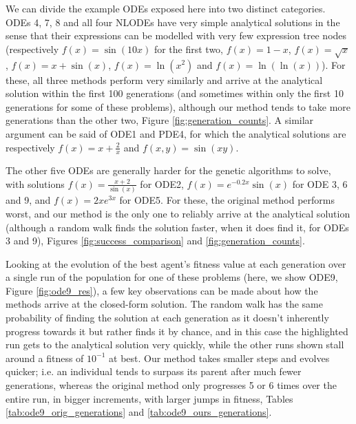 \documentclass[aps,reprint,superscriptaddress,nofootinbib]{revtex4-2}
\begin{document}
    We can divide the example ODEs exposed here into two distinct categories. ODEs 4, 7, 8 and all four NLODEs have very simple analytical solutions in the sense that their expressions can be modelled with very few expression tree nodes (respectively \(f(x) = \sin(10x)\) for the first two, \(f(x) = 1-x\), \(f(x) = \sqrt{x}\), \(f(x) = x + \sin(x)\), \(f(x) = \ln(x^2)\) and \(f(x) = \ln(\ln(x))\)). For these, all three methods perform very similarly and arrive at the analytical solution within the first 100 generations (and sometimes within only the first 10 generations for some of these problems), although our method tends to take more generations than the other two, Figure \ref{fig:generation_counts}. A similar argument can be said of ODE1 and PDE4, for which the analytical solutions are respectively \(f(x) = x + \frac{2}{x}\) and \(f(x, y) = \sin(xy)\).
    
    The other five ODEs are generally harder for the genetic algorithms to solve, with solutions \(f(x) = \frac{x+2}{\sin(x)}\) for ODE2, \(f(x) = e^{-0.2x}\sin(x)\) for ODE 3, 6 and 9, and \(f(x) = 2xe^{3x}\) for ODE5. For these, the original method performs worst, and our method is the only one to reliably arrive at the analytical solution (although a random walk finds the solution faster, when it does find it, for ODEs 3 and 9), Figures \ref{fig:success_comparison} and \ref{fig:generation_counts}.
    
    Looking at the evolution of the best agent's fitness value at each generation over a single run of the population for one of these problems (here, we show ODE9, Figure \ref{fig:ode9_res}), a few key observations can be made about how the methods arrive at the closed-form solution. The random walk has the same probability of finding the solution at each generation as it doesn't inherently progress towards it but rather finds it by chance, and in this case the highlighted run gets to the analytical solution very quickly, while the other runs shown stall around a fitness of \(10^{-1}\) at best. Our method takes smaller steps and evolves quicker; i.e. an individual tends to surpass its parent after much fewer generations, whereas the original method only progresses 5 or 6 times over the entire run, in bigger increments, with larger jumps in fitness, Tables \ref{tab:ode9_orig_generations} and \ref{tab:ode9_ours_generations}.
    
\end{document}
